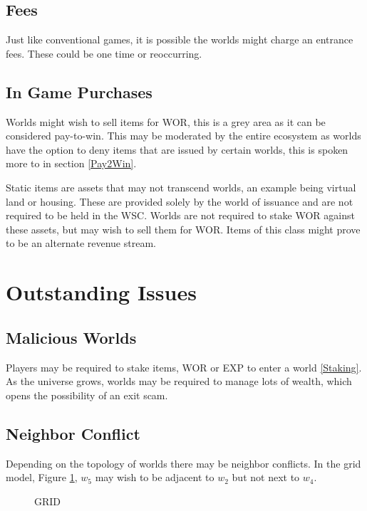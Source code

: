 \documentclass[runningheads,a4paper]{llncs}
\begin{document}
\subsection{Fees}
Just like conventional games, it is possible the worlds might charge an entrance fees. These could be one time or reoccurring.

\subsection{In Game Purchases}
Worlds might wish to sell items for WOR, this is a grey area as it can be considered pay-to-win. This may be  moderated by the entire ecosystem as worlds have the option to deny items that are issued by certain worlds, this is spoken more to in section \ref{Pay2Win}. 

Static items are assets that may not transcend worlds, an example being virtual land or housing. These are provided solely by the world of issuance and are not required to be held in the WSC. Worlds are not required to stake WOR against these assets, but may wish to sell them for WOR. Items of this class might prove to be an alternate revenue stream.

\section{Outstanding Issues}
\subsection{Malicious Worlds}
Players may be required to stake items, WOR or EXP to enter a world \ref{Staking}. As the universe grows, worlds may be required to manage lots of wealth, which opens the possibility of an exit scam.

\subsection{Neighbor Conflict}
Depending on the topology of worlds there may be neighbor conflicts. In the grid model, Figure \ref{GRID}, $w_5$ may wish to be adjacent to $w_2$ but not next to $w_4$. 

\begin{figure}
\centering
\caption{GRID}
\label{GRID}
\end{figure}
\end{document}
